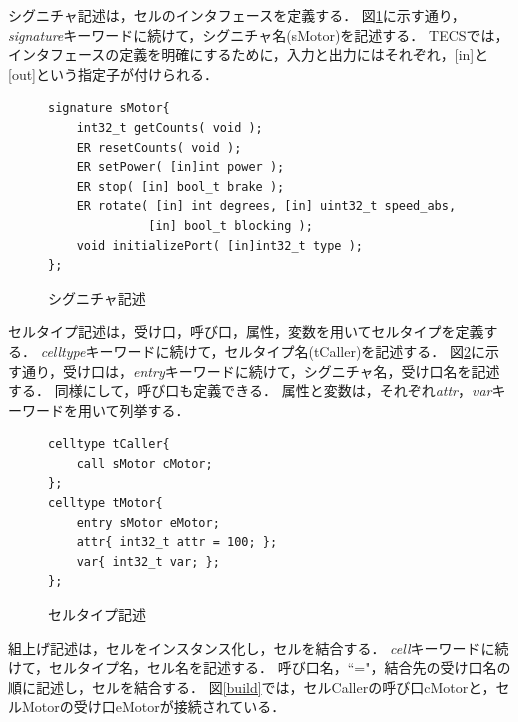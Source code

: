 \documentclass[submit,techrep]{ipsj}
\begin{document}
        シグニチャ記述は，セルのインタフェースを定義する．
        図\ref{signature}に示す通り，{\it signature}キーワードに続けて，シグニチャ名(sMotor)を記述する．
        TECSでは，インタフェースの定義を明確にするために，入力と出力にはそれぞれ，[in]と[out]という指定子が付けられる．
        
\begin{figure}[t]
\centering
\begin{lstlisting}
signature sMotor{
    int32_t getCounts( void );
    ER resetCounts( void );
    ER setPower( [in]int power );
    ER stop( [in] bool_t brake );
    ER rotate( [in] int degrees, [in] uint32_t speed_abs,
              [in] bool_t blocking );
    void initializePort( [in]int32_t type );
};
\end{lstlisting}
    \vspace{-2mm}
\caption{シグニチャ記述}
\vspace{-5mm}
\label{signature}
\end{figure}

        セルタイプ記述は，受け口，呼び口，属性，変数を用いてセルタイプを定義する．
        {\it celltype}キーワードに続けて，セルタイプ名(tCaller)を記述する．
        図\ref{celltype}に示す通り，受け口は，{\it entry}キーワードに続けて，シグニチャ名，受け口名を記述する．
        同様にして，呼び口も定義できる．
        属性と変数は，それぞれ{\it attr}，{\it var}キーワードを用いて列挙する．

\begin{figure}[t]
\centering
\begin{lstlisting}
celltype tCaller{
    call sMotor cMotor;
};
celltype tMotor{
    entry sMotor eMotor;
    attr{ int32_t attr = 100; };
    var{ int32_t var; };
};
\end{lstlisting}
    \vspace{-2mm}
\caption{セルタイプ記述}  
\vspace{-4mm}
\label{celltype}
\end{figure}

        組上げ記述は，セルをインスタンス化し，セルを結合する．
        {\it cell}キーワードに続けて，セルタイプ名，セル名を記述する．
        呼び口名，``="，結合先の受け口名の順に記述し，セルを結合する．
        図\ref{build}では，セルCallerの呼び口cMotorと，セルMotorの受け口eMotorが接続されている．
        
\end{document}

